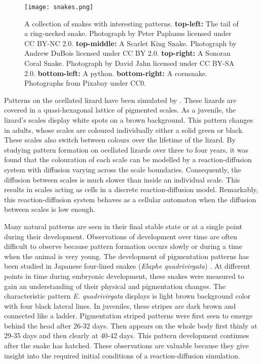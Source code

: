 \begin{figure}[hb]
	\centering
	\texttt{[image: snakes.png]}
	\caption{A collection of snakes with interesting patterns. \textbf{top-left:} The tail of a ring-necked snake. Photograph by Peter Paplanus licensed under CC BY-NC 2.0. \textbf{top-middle:} A Scarlet King Snake. Photograph by Andrew DuBois licensed under CC BY 2.0. \textbf{top-right:} A Sonoran Coral Snake. Photograph by David Jahn licensed under CC BY-SA 2.0. \textbf{bottom-left:} A python. \textbf{bottom-right:} A cornsnake. Photographs from Pixabay under CC0.}
	\label{fig:realSnakePatterns}
\end{figure}

Patterns on the ocellated lizard have been simulated by \cite{manukyan2017}. These lizards are covered in a quasi-hexagonal lattice of pigmented scales. As a juvenile, the lizard's scales display white spots on a brown background. This pattern changes in adults, whose scales are coloured individually either a solid green or black. These scales also switch between colours over the lifetime of the lizard. By studying pattern formation on ocellated lizards over three to four years, it was found that the colouration of each scale can be modelled by a reaction-diffusion system with diffusion varying across the scale boundaries. Consequently, the diffusion between scales is much slower than inside an individual scale. This results in scales acting as cells in a discrete reaction-diffusion model. Remarkably, this reaction-diffusion system behaves as a cellular automaton when the diffusion between scales is low enough.

Many natural patterns are seen in their final stable state or at a single point during their development. Observations of development over time are often difficult to observe because pattern formation occurs slowly or during a time when the animal is very young. The development of pigmentation patterns has been studied in Japanese four-lined snakes (\textit{Elaphe quadrivirgata}) \cite{murakami2018}. At different points in time during embryonic development, these snakes were measured to gain an understanding of their physical and pigmentation changes. The characteristic pattern \textit{E. quadrivirgata} displays is light brown background color with four black lateral lines. In juveniles, these stripes are dark brown and connected like a ladder. Pigmentation striped patterns were first seen to emerge behind the head after 26-32 days. Then appears on the whole body first thinly at 29-35 days and then clearly at 40-42 days. This pattern development continues after the snake has hatched. These observations are valuable because they give insight into the required initial conditions of a reaction-diffusion simulation.

